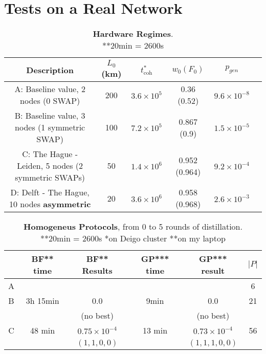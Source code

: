 \documentclass{article}
\begin{document}
\section*{Tests on a Real Network}

\begin{table}[h!]
    \centering
    \begin{tabular}{|c|c|c|c|c|c|}
        \hline
        Description & $L_0$ (km) & $t_{\text{coh}}^*$ & $w_0 (F_0)$ & $p_{gen}$ \\
        \hline
        \hline
        A: Baseline value, 2 nodes (0 SWAP) & 200  & $3.6 \times 10^5$ & 0.36 (0.52) & $9.6 \times 10^{-8}$ \\
        \hline
        B: Baseline value, 3 nodes (1 symmetric SWAP) & 100  & $7.2 \times 10^5$ & 0.867 (0.9) & $1.5 \times 10^{-5}$ \\
        \hline
        C: The Hague - Leiden, 5 nodes (2 symmetric SWAPs) & 50  & $1.4 \times 10^6$ & 0.952 (0.964) & $9.2 \times 10^{-4}$ \\
        \hline
        D: Delft - The Hague, 10 nodes \textbf{asymmetric} & 20  & $3.6 \times 10^6$ & 0.958 (0.968) & $2.6 \times 10^{-3}$ \\
        \hline
    \end{tabular}
    \caption{\textbf{Hardware Regimes}. \\**20min = 2600s}
\end{table}

\begin{table}[h!]
    \centering
    \begin{tabular}{|c|c|c|c|c|c|}
        \hline
        & BF** time & BF** Results & GP*** time & GP*** result & $|P|$ \\
        \hline
        \hline
        A & & & & & 6 \\
        \hline
        B & 3h 15min & 0.0 & 9min & 0.0 & 21 \\
        & & (no best) & & (no best) & \\
        \hline
        C & 48 min & $0.75 \times 10^{-4}$ & 13 min & $0.73 \times 10^{-4}$ & 56 \\
        & & $(1,1,0,0)$ & & $(1,1,1,0,0)$ & \\
        \hline
    \end{tabular}
    \caption{\textbf{Homogeneus Protocols}, from 0 to 5 rounds of distillation. \\**20min = 2600s \quad **on Deigo cluster \quad ***on my laptop}
\end{table}
\end{document}
